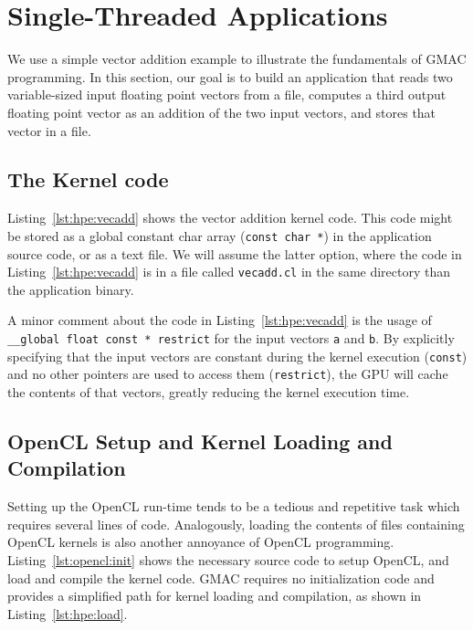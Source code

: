 \section{Single\hyp{}Threaded Applications}

We use a simple vector addition example to illustrate the fundamentals of GMAC programming. In this 
section, our goal is to build an application that reads two variable\hyp{}sized input floating point 
vectors from a file, computes a third output floating point vector as an addition of the two input 
vectors, and stores that vector in a file.

\subsection{The Kernel code}
Listing~\ref{lst:hpe:vecadd} shows the vector addition kernel code. This code might be stored as a 
global constant char array (\ie \texttt{const char *}) in the application source code, or as a text 
file. We will assume the latter option, where the code in Listing~\ref{lst:hpe:vecadd} is in a file 
called \texttt{vecadd.cl} in the same directory than the application binary.



A minor comment about the code in Listing~\ref{lst:hpe:vecadd} is the usage of \texttt{\_\_global 
float const * restrict} for the input  vectors \texttt{a} and \texttt{b}. By explicitly specifying 
that the input vectors are constant during the kernel execution (\ie \texttt{const}) and no other 
pointers are used to access them (\ie \texttt{restrict}), the GPU will cache the contents of that 
vectors, greatly reducing the kernel execution time.

\subsection{OpenCL Setup and Kernel Loading and Compilation}
Setting up the OpenCL run\hyp{}time tends to be a tedious and repetitive task which requires several 
lines of code. Analogously, loading the contents of files containing OpenCL kernels is also another 
annoyance of OpenCL programming. Listing~\ref{lst:opencl:init} shows the necessary source code to 
setup OpenCL, and load and compile the kernel code. GMAC requires no initialization code and 
provides a simplified path for kernel loading and compilation, as shown in 
Listing~\ref{lst:hpe:load}. 

